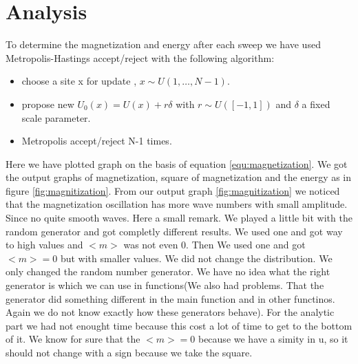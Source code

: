 \documentclass[11pt, a4paper, DIV=12]{scrartcl}
\begin{document}
\section{Analysis}
To determine the magnetization and energy after each sweep we have used Metropolis-Hastings accept/reject with the following algorithm:
\begin{itemize}
	\item choose a site x for update , $ x \sim U(1, \dots, N-1) $.
	\item propose new $ U_{0}(x)= U(x) +r\delta $ with $ r \sim U([-1, 1]) $ and $ \delta $ a fixed scale parameter.	
	\item Metropolis accept/reject N-1 times.
\end{itemize}
 Here we have plotted graph on the basis of equation \ref{equ:magnetization}. We got the output graphs of magnetization, square of magnetization and the energy as in figure \ref{fig:magnitization}. From our output graph \ref{fig:magnitization} we noticed that the magnetization oscillation has more wave numbers with small amplitude. Since no quite smooth waves. Here a small remark. We played a little bit with the random generator and got completly different results. We used one and got way to high values and $<m>$ was not even 0. Then We used one and got $<m>=0$ but with smaller values. We did not change the distribution. We only changed the random number generator. We have no idea what the right generator is which we can use in functions(We also had problems. That the generator did something different in the main function and in other functinos. Again we do not know exactly how these generators behave). For the analytic part we had not enought time because this cost a lot of time to get to the bottom of it. We know for sure that the $<m>=0$ because we have a simity in u, so it should not change with a sign because we take the square.
\end{document}

